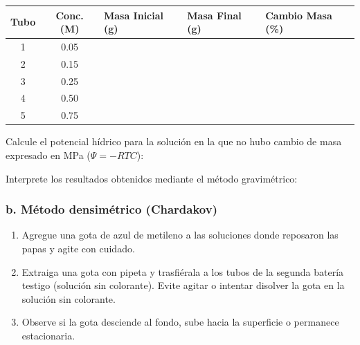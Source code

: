 \documentclass[
  spanish,
  10pt,
  letterpaper,
  twocolumn]{article}
\begin{document}
\begin{tabular}{c|c|p{1.5cm}|p{1.5cm}|p{1.5cm}}
\hline
Tubo & Conc. (M) & Masa Inicial (g) & Masa Final (g) & Cambio Masa (\%) \\
\hline
1 & 0.05 &  &  &  \\
\hline
2 & 0.15 &  &  &  \\
\hline
3 & 0.25 &  &  &  \\
\hline
4 & 0.50 &  &  &  \\
\hline
5 & 0.75 &  &  &  \\
\hline
\end{tabular}

Calcule el potencial hídrico para la solución en la que no hubo cambio
de masa expresado en MPa (\(\Psi = -RTC\)):

\hrulefill

\hrulefill

Interprete los resultados obtenidos mediante el método gravimétrico:

\hrulefill

\hrulefill

\hrulefill

\hrulefill

\hrulefill

\subsubsection{b. Método densimétrico
(Chardakov)}\label{b.-muxe9todo-densimuxe9trico-chardakov}

\begin{enumerate}
\def\labelenumi{\arabic{enumi}.}
\item
  Agregue una gota de azul de metileno a las soluciones donde reposaron
  las papas y agite con cuidado.
\item
  Extraiga una gota con pipeta y trasfiérala a los tubos de la segunda
  batería testigo (solución sin colorante). Evite agitar o intentar
  disolver la gota en la solución sin colorante.
\item
  Observe si la gota desciende al fondo, sube hacia la superficie o
  permanece estacionaria.
\end{enumerate}
\end{document}
